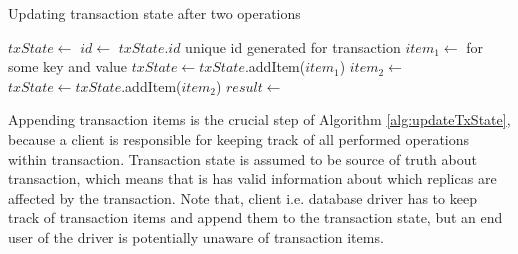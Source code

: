 

\begin{algorithm}
  \caption{Updating transaction state after two operations}
  \label{alg:updateTxState}
  \begin{algorithmic}  	    
    \State $txState \gets$ 
    \State $id \gets$ $txState.id$ unique id generated for transaction
    \State $item_{1} \gets $  \Comment for some key and value
    \State $txState \gets txState$.addItem($item_{1}$)
    \State $item_{2} \gets $ 
    \State $txState \gets txState$.addItem($item_{2}$)
    \State $result \gets $     
  \end{algorithmic}
\end{algorithm}

Appending transaction items is the crucial step of Algorithm \ref{alg:updateTxState}, because a client is responsible for keeping track of all performed operations within transaction. Transaction state is assumed to be source of truth about transaction, which means that is has valid information about which replicas are affected by the transaction.
Note that, client i.e. database driver has to keep track of transaction items and append them to the transaction state, but an end user of the driver is potentially unaware of transaction items.


